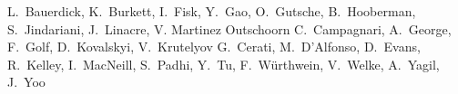 \begin{Authlist}
%
L.~Bauerdick, K.~Burkett, I.~Fisk, Y.~Gao, O.~Gutsche, B.~Hooberman, S.~Jindariani,  J.~Linacre, V. Martinez Outschoorn
%
C.~Campagnari, A.~George, F.~Golf, D.~Kovalskyi, V.~Krutelyov
%
G.~Cerati, M.~D'Alfonso, D.~Evans, R.~Kelley, I.~MacNeill, S.~Padhi, Y.~Tu, F.~W\"urthwein, V.~Welke, A.~Yagil, J.~Yoo

\end{Authlist}
